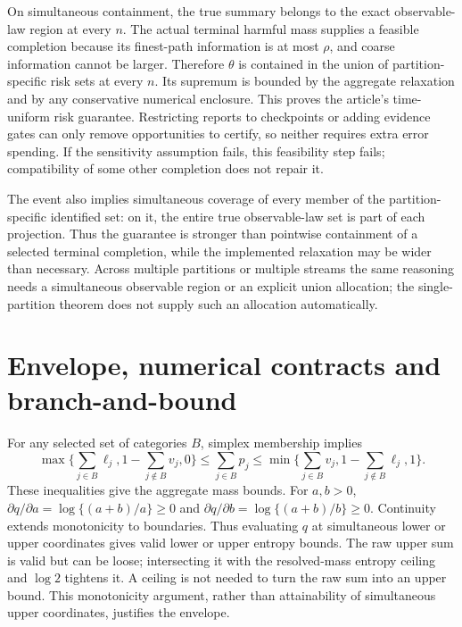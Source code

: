 \documentclass[10pt]{article}
\begin{document}
On simultaneous containment, the true summary belongs to the exact observable-law region at every $n$. The actual terminal harmful mass supplies a feasible completion because its finest-path information is at most $\rho$, and coarse information cannot be larger. Therefore $\theta$ is contained in the union of partition-specific risk sets at every $n$. Its supremum is bounded by the aggregate relaxation and by any conservative numerical enclosure. This proves the article's time-uniform risk guarantee. Restricting reports to checkpoints or adding evidence gates can only remove opportunities to certify, so neither requires extra error spending. If the sensitivity assumption fails, this feasibility step fails; compatibility of some other completion does not repair it.

The event also implies simultaneous coverage of every member of the partition-specific identified set: on it, the entire true observable-law set is part of each projection. Thus the guarantee is stronger than pointwise containment of a selected terminal completion, while the implemented relaxation may be wider than necessary. Across multiple partitions or multiple streams the same reasoning needs a simultaneous observable region or an explicit union allocation; the single-partition theorem does not supply such an allocation automatically.

\section{Envelope, numerical contracts and branch-and-bound}
For any selected set of categories $B$, simplex membership implies
\begin{equation}
 \max\{\sum_{j\in B}\ell_j,1-\sum_{j\notin B}v_j,0\}
 \le\sum_{j\in B}p_j\le
 \min\{\sum_{j\in B}v_j,1-\sum_{j\notin B}\ell_j,1\}.
\end{equation}
These inequalities give the aggregate mass bounds. For $a,b>0$, $\partial q/\partial a=\log\{(a+b)/a\}\ge0$ and $\partial q/\partial b=\log\{(a+b)/b\}\ge0$. Continuity extends monotonicity to boundaries. Thus evaluating $q$ at simultaneous lower or upper coordinates gives valid lower or upper entropy bounds. The raw upper sum is valid but can be loose; intersecting it with the resolved-mass entropy ceiling and $\log2$ tightens it. A ceiling is not needed to turn the raw sum into an upper bound. This monotonicity argument, rather than attainability of simultaneous upper coordinates, justifies the envelope.
\end{document}

